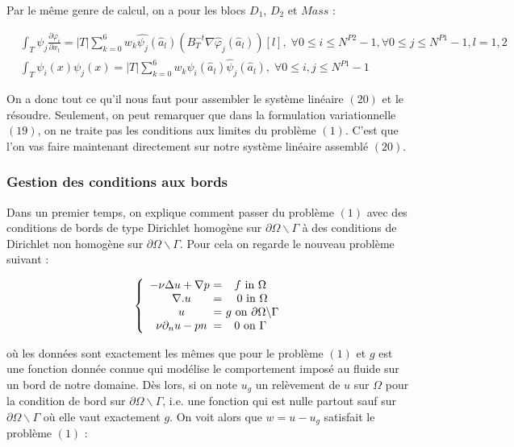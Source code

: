 \documentclass[a4paper,12pt]{article}
\begin{document}
Par le même genre de calcul, on a pour les blocs $D_1$, $D_2$ et $Mass$ :

\begin{equation*}
\begin{split}
& \int_T \psi_j \frac{\partial \varphi_i}{\partial x_l} = |T| \sum_{k=0}^{6} w_k \widehat{\psi_j} (\widehat{a}_l) \left( B^{-t}_T \nabla \widehat{\varphi}_j (\widehat{a}_l) \right)[l], \; \forall 0 \leq i \leq N^{P2}-1, \forall 0 \leq j \leq N^{P1}-1, l = 1,2  \\
& \int_T \psi_i (x) \psi_j (x) = |T| \sum_{k=0}^{6} w_k \widehat{\psi}_i (\widehat{a}_l) \widehat{\psi}_j (\widehat{a}_l), \; \forall 0 \leq i,j \leq N^{P1}-1
\end{split}
\end{equation*}

On a donc tout ce qu'il nous faut pour assembler le système linéaire $(20)$ et le résoudre. Seulement, on peut remarquer que dans la formulation variationnelle $(19)$, on ne traite pas les conditions aux limites du problème $(1)$. C'est que l'on vas faire maintenant directement sur notre système linéaire assemblé $(20)$.



\subsubsection{Gestion des conditions aux bords}

Dans un premier temps, on explique comment passer du problème $(1)$ avec des conditions de bords de type Dirichlet homogène sur $\partial \Omega \backslash \Gamma$ à des conditions de Dirichlet non homogène sur $\partial \Omega \backslash \Gamma$. Pour cela on regarde le nouveau problème suivant :

\begin{equation}
\left \{
\begin{array}{c @{ = } c}
    -\nu \Delta u + \nabla p \text{ } & f \text{ in } \Omega\\
    \nabla . u & \text{ } 0 \text{ in } \Omega\\
    u & \text{ } g \text{ on } \partial\Omega \backslash \Gamma\\
    \nu\partial_{n}u - pn & 0 \text{ on } \Gamma\\
\end{array}
\right.
\end{equation}

où les données sont exactement les mêmes que pour le problème $(1)$ et $g$ est une fonction donnée connue qui modélise le comportement imposé au fluide sur un bord de notre domaine.
Dès lors, si on note $u_g$ un relèvement de $u$ sur $\Omega$ pour la condition de bord sur $\partial \Omega \backslash \Gamma$, i.e. une fonction qui est nulle partout sauf sur $\partial \Omega \backslash \Gamma$ où elle vaut exactement $g$. On voit alors que $w=u-u_g$ satisfait le problème $(1)$ :
\end{document}
